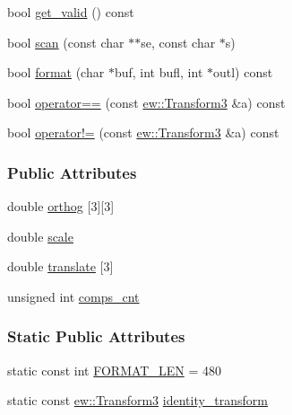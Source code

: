 \begin{DoxyCompactItemize}
\item 
bool \hyperlink{classew_1_1Transform3_af2135defdbe3922a8efee881e3fdeee4}{get\_\-valid} () const 
\item 
bool \hyperlink{classew_1_1Transform3_afde5bca8b951d4fa6d00239e2ca6ad1d}{scan} (const char $\ast$$\ast$se, const char $\ast$s)
\item 
bool \hyperlink{classew_1_1Transform3_a42b80dfe1e723349229da7ff40497fdd}{format} (char $\ast$buf, int bufl, int $\ast$outl) const 
\item 
bool \hyperlink{classew_1_1Transform3_a9cfe6e3d52ea1d67e6127ae9dc11da36}{operator==} (const \hyperlink{classew_1_1Transform3}{ew::Transform3} \&a) const 
\item 
bool \hyperlink{classew_1_1Transform3_a2ec82c58507f198f85b82434e84a6767}{operator!=} (const \hyperlink{classew_1_1Transform3}{ew::Transform3} \&a) const 
\end{DoxyCompactItemize}
\subsubsection*{Public Attributes}
\begin{DoxyCompactItemize}
\item 
double \hyperlink{classew_1_1Transform3_abbb79dd74876557bc765a54e115c4f66}{orthog} \mbox{[}3\mbox{]}\mbox{[}3\mbox{]}
\item 
double \hyperlink{classew_1_1Transform3_a27f775e77a4563a8f26f3131be6ed1fd}{scale}
\item 
double \hyperlink{classew_1_1Transform3_afb7de921c22991010272eb3cea8ddc70}{translate} \mbox{[}3\mbox{]}
\item 
unsigned int \hyperlink{classew_1_1Transform3_ad2ca5cecae4fe2dfbc8b862b42891991}{comps\_\-cnt}
\end{DoxyCompactItemize}
\subsubsection*{Static Public Attributes}
\begin{DoxyCompactItemize}
\item 
static const int \hyperlink{classew_1_1Transform3_a2b175dad0b7114445c12ef9928bc34b2}{FORMAT\_\-LEN} = 480
\item 
static const \hyperlink{classew_1_1Transform3}{ew::Transform3} \hyperlink{classew_1_1Transform3_a26e0b30e3ee6032091d94ea73effa0ad}{identity\_\-transform}
\end{DoxyCompactItemize}



